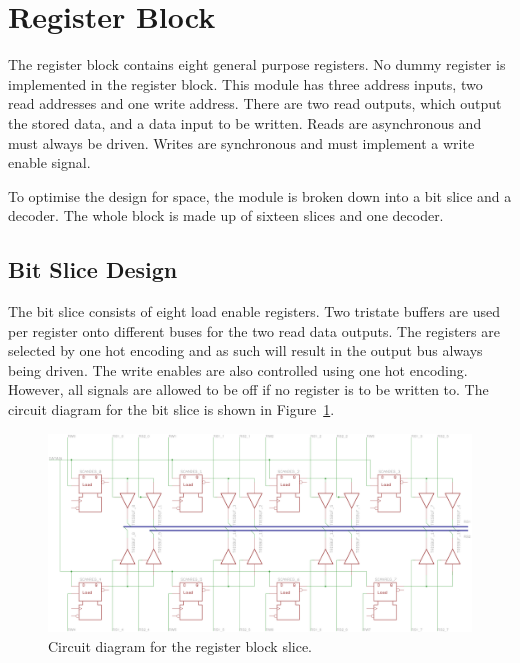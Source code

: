 
\section{Register Block}

The register block contains eight general purpose registers. 
No dummy register is implemented in the register block. 
This module has three address inputs, two read addresses and one write address. 
There are two read outputs, which output the stored data, and a data input to be written. 
Reads are asynchronous and must always be driven. 
Writes are synchronous and must implement a write enable signal. 

To optimise the design for space, the module is broken down into a bit slice and a decoder. 
The whole block is made up of sixteen slices and one decoder. 

\subsection{Bit Slice Design}

The bit slice consists of eight load enable registers. 
Two tristate buffers are used per register onto different buses for the two read data outputs. 
The registers are selected by one hot encoding and as such will result in the output bus always being driven. 
The write enables are also controlled using one hot encoding. 
However, all signals are allowed to be off if no register is to be written to.
The circuit diagram for the bit slice is shown in Figure~\ref{fig:reg:slice}.

\begin{figure}
\centering
\includegraphics[angle=90,height=\textheight]{../../eagle/regBlock/regBlock_slice.png}
\caption{Circuit diagram for the register block slice.}
\label{fig:reg:slice}
\end{figure}



